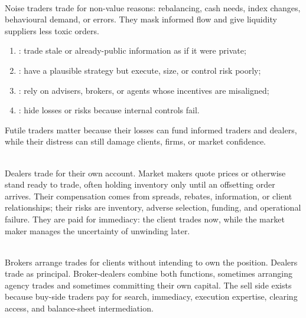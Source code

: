 \begin{definition} \\
Noise traders trade for non-value reasons: rebalancing, cash needs, index changes, behavioural demand, or errors. They mask informed flow and give liquidity suppliers less toxic orders.
\end{definition}

\begin{taxonomy} 
\begin{enumerate}[label=\roman*.]
\setlength{\itemsep}{0pt}
\item {}: trade stale or already-public information as if it were private;
\item {}: have a plausible strategy but execute, size, or control risk poorly;
\item {}: rely on advisers, brokers, or agents whose incentives are misaligned;
\item {}: hide losses or risks because internal controls fail.
\end{enumerate}
Futile traders matter because their losses can fund informed traders and dealers, while their distress can still damage clients, firms, or market confidence.
\end{taxonomy}

\begin{mechanism} \\
Dealers trade for their own account. Market makers quote prices or otherwise stand ready to trade, often holding inventory only until an offsetting order arrives. Their compensation comes from spreads, rebates, information, or client relationships; their risks are inventory, adverse selection, funding, and operational failure.
They are paid for immediacy: the client trades now, while the market maker manages the uncertainty of unwinding later.
\end{mechanism}

\begin{taxonomy} \\
Brokers arrange trades for clients without intending to own the position. Dealers trade as principal. Broker-dealers combine both functions, sometimes arranging agency trades and sometimes committing their own capital. The sell side exists because buy-side traders pay for search, immediacy, execution expertise, clearing access, and balance-sheet intermediation.
\end{taxonomy}

